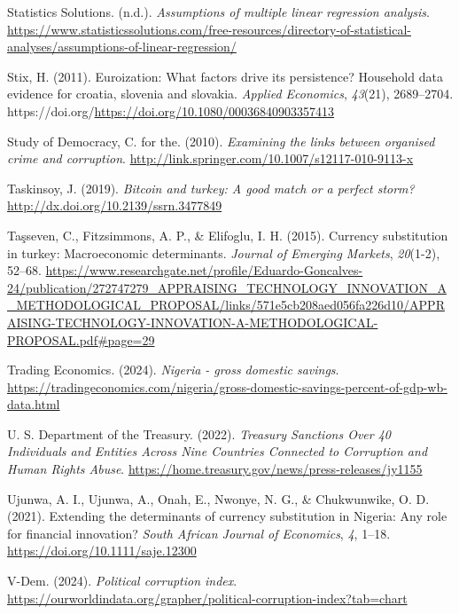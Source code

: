 \documentclass[
]{article}
\newlength{\cslhangindent}
\newenvironment{CSLReferences}[2] %
 {\begin{list}{}{%
  \setlength{\itemindent}{0pt}
  \setlength{\leftmargin}{0pt}
  \setlength{\parsep}{0pt}
  \ifodd #1
   \setlength{\leftmargin}{\cslhangindent}
   \setlength{\itemindent}{-1\cslhangindent}
  \fi
  \setlength{\itemsep}{#2\baselineskip}}}
 {\end{list}}
\begin{document}
\begin{CSLReferences}{1}{0}
Statistics Solutions. (n.d.). \emph{Assumptions of multiple linear regression analysis}. \url{https://www.statisticssolutions.com/free-resources/directory-of-statistical-analyses/assumptions-of-linear-regression/}

Stix, H. (2011). Euroization: What factors drive its persistence? Household data evidence for croatia, slovenia and slovakia. \emph{Applied Economics}, \emph{43}(21), 2689--2704. https://doi.org/\url{https://doi.org/10.1080/00036840903357413}

Study of Democracy, C. for the. (2010). \emph{Examining the links between organised crime and corruption}. \url{http://link.springer.com/10.1007/s12117-010-9113-x}

Taskinsoy, J. (2019). \emph{Bitcoin and turkey: A good match or a perfect storm?} \url{http://dx.doi.org/10.2139/ssrn.3477849}

Taşseven, C., Fitzsimmons, A. P., \& Elifoglu, I. H. (2015). Currency substitution in turkey: Macroeconomic determinants. \emph{Journal of Emerging Markets}, \emph{20}(1-2), 52--68. \url{https://www.researchgate.net/profile/Eduardo-Goncalves-24/publication/272747279_APPRAISING_TECHNOLOGY_INNOVATION_A_METHODOLOGICAL_PROPOSAL/links/571e5cb208aed056fa226d10/APPRAISING-TECHNOLOGY-INNOVATION-A-METHODOLOGICAL-PROPOSAL.pdf\#page=29}

Trading Economics. (2024). \emph{Nigeria - gross domestic savings}. \url{https://tradingeconomics.com/nigeria/gross-domestic-savings-percent-of-gdp-wb-data.html}

U. S. Department of the Treasury. (2022). \emph{Treasury Sanctions Over 40 Individuals and Entities Across Nine Countries Connected to Corruption and Human Rights Abuse}. \url{https://home.treasury.gov/news/press-releases/jy1155}

Ujunwa, A. I., Ujunwa, A., Onah, E., Nwonye, N. G., \& Chukwunwike, O. D. (2021). Extending the determinants of currency substitution in Nigeria: Any role for financial innovation? \emph{South African Journal of Economics}, \emph{4}, 1--18. \url{https://doi.org/10.1111/saje.12300}

V-Dem. (2024). \emph{Political corruption index}. \url{https://ourworldindata.org/grapher/political-corruption-index?tab=chart}


\end{CSLReferences}
\end{document}
